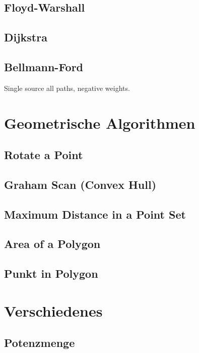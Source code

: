 \documentclass[10pt,a4paper,ngerman]{article}
\begin{document}
\subsection{Floyd-Warshall}

\subsection{Dijkstra}

\subsection{Bellmann-Ford}
Single source all paths, negative weights.


\section{Geometrische Algorithmen}
\subsection{Rotate a Point}

\subsection{Graham Scan (Convex Hull)}

\subsection{Maximum Distance in a Point Set}

\subsection{Area of a Polygon}

\subsection{Punkt in Polygon}


\section{Verschiedenes}
\subsection{Potenzmenge}

\end{document}
